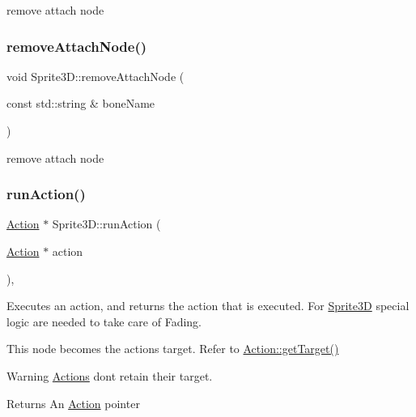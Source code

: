 remove attach node \mbox{\label{classSprite3D_a39e52d6b3fc8cf7e8fe5dfb047880308}} 
\subsubsection{\texorpdfstring{remove\+Attach\+Node()}{removeAttachNode()}\hspace{0.1cm}{\footnotesize\ttfamily [2/2]}}
{\footnotesize\ttfamily void Sprite3\+D\+::remove\+Attach\+Node (\begin{DoxyParamCaption}\item[{const std\+::string \&}]{bone\+Name }\end{DoxyParamCaption})}

remove attach node \mbox{\label{classSprite3D_a6447200e96db21bc79df873e598fcf4a}} 
\subsubsection{\texorpdfstring{run\+Action()}{runAction()}\hspace{0.1cm}{\footnotesize\ttfamily [1/2]}}
{\footnotesize\ttfamily \hyperlink{classAction}{Action} $\ast$ Sprite3\+D\+::run\+Action (\begin{DoxyParamCaption}\item[{\hyperlink{classAction}{Action} $\ast$}]{action }\end{DoxyParamCaption})\hspace{0.3cm}{\ttfamily [override]}, {\ttfamily [virtual]}}

Executes an action, and returns the action that is executed. For \hyperlink{classSprite3D}{Sprite3D} special logic are needed to take care of Fading.

This node becomes the action\textquotesingle{}s target. Refer to \hyperlink{classAction_a696d1ef82807cc18207ba93d59d6ca16}{Action\+::get\+Target()} \begin{DoxyWarning}{Warning}
\hyperlink{classActions}{Actions} don\textquotesingle{}t retain their target.
\end{DoxyWarning}
\begin{DoxyReturn}{Returns}
An \hyperlink{classAction}{Action} pointer 
\end{DoxyReturn}


